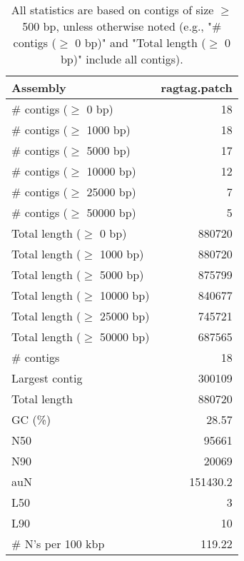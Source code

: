 \documentclass[12pt,a4paper]{article}
\begin{document}
\begin{table}[ht]
\begin{center}
\caption{All statistics are based on contigs of size $\geq$ 500 bp, unless otherwise noted (e.g., "\# contigs ($\geq$ 0 bp)" and "Total length ($\geq$ 0 bp)" include all contigs).}
\begin{tabular}{|l*{1}{|r}|}
\hline
Assembly & ragtag.patch \\ \hline
\# contigs ($\geq$ 0 bp) & 18 \\ \hline
\# contigs ($\geq$ 1000 bp) & 18 \\ \hline
\# contigs ($\geq$ 5000 bp) & 17 \\ \hline
\# contigs ($\geq$ 10000 bp) & 12 \\ \hline
\# contigs ($\geq$ 25000 bp) & 7 \\ \hline
\# contigs ($\geq$ 50000 bp) & 5 \\ \hline
Total length ($\geq$ 0 bp) & 880720 \\ \hline
Total length ($\geq$ 1000 bp) & 880720 \\ \hline
Total length ($\geq$ 5000 bp) & 875799 \\ \hline
Total length ($\geq$ 10000 bp) & 840677 \\ \hline
Total length ($\geq$ 25000 bp) & 745721 \\ \hline
Total length ($\geq$ 50000 bp) & 687565 \\ \hline
\# contigs & 18 \\ \hline
Largest contig & 300109 \\ \hline
Total length & 880720 \\ \hline
GC (\%) & 28.57 \\ \hline
N50 & 95661 \\ \hline
N90 & 20069 \\ \hline
auN & 151430.2 \\ \hline
L50 & 3 \\ \hline
L90 & 10 \\ \hline
\# N's per 100 kbp & 119.22 \\ \hline
\end{tabular}
\end{center}
\end{table}
\end{document}
